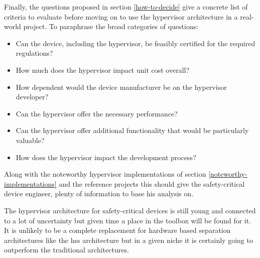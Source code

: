 Finally, the questions proposed in section \ref{how-to-decide} give a concrete list of criteria to evaluate before moving on to use the hypervisor architecture in a real-world project. To paraphrase the broad categories of questions:
\begin{itemize}
    \item Can the device, including the hypervisor, be feasibly certified for the required regulations?
    \item How much does the hypervisor impact unit cost overall?
    \item How dependent would the device manufacturer be on the hypervisor developer?
    \item Can the hypervisor offer the necessary performance?
    \item Can the hypervisor offer additional functionality that would be particularly valuable?
    \item How does the hypervisor impact the development process?
\end{itemize}
Along with the noteworthy hypervisor implementations of section \ref{noteworthy-implementations} and the reference projects this should give the safety-critical device engineer, plenty of information to base his analysis on. 

The hypervisor architecture for safety-critical devices is still young and connected to a lot of uncertainty but given time a place in the toolbox will be found for it. It is unlikely to be a complete replacement for hardware based separation architectures like the \acrshort{hss} architecture but in a given niche it is certainly going to outperform the traditional architectures.


\begin{comment} 
* Mixed criticality has been present for a long time in very complex projects but with increased processing power and user demands it makes more and more sense in smaller devices.
* For this reason and because of efforts in some industries to save SWaP alternate solutions to the mixed criticality problem have been seeing some adoption.
* One of these is the hypervisor that this thesis set out to compare more in-depth.
* From that comparison the crucial differences and their effects emerged
* [Refer to conclusion from that section]
* Based on this some reference project have been proposed that can be categorized into these [] categories.
* Ultimately it can be said the hypervisor has a couple of very promising places of application.
* So it can be said the best scenarios for the hypervisor architecture are the ones where this happens: []
* The advent of microkernel based safety hypervisors along with the maturation in virtualization technology, especially in the embedded space provides an avenue to deal with the problems that arise from mixed criticality.
\end{comment}
